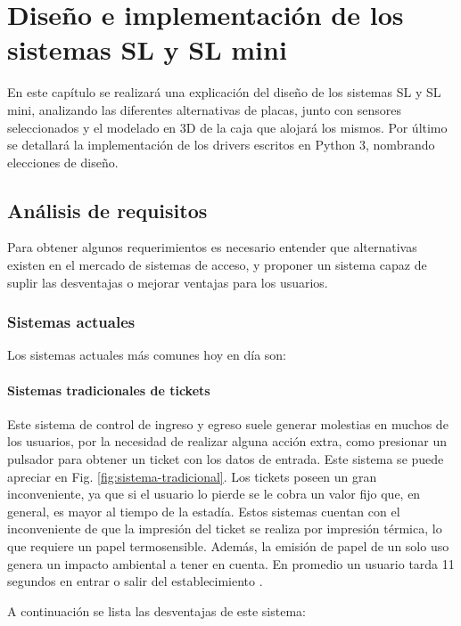\chapter{Diseño e implementación de los sistemas SL y SL mini}

En este capítulo se realizará una explicación del diseño de los sistemas SL y SL mini, analizando las diferentes alternativas de placas, junto con sensores seleccionados y el modelado en 3D de la caja que alojará los mismos. Por último se detallará la implementación de los drivers escritos en Python 3, nombrando elecciones de diseño.

\section{Análisis de requisitos}

Para obtener algunos requerimientos es necesario entender que alternativas existen en el mercado de sistemas de acceso, y proponer un sistema capaz de suplir las desventajas o mejorar ventajas para los usuarios.

\subsection{Sistemas actuales}

Los sistemas actuales más comunes hoy en día son:

\subsubsection*{Sistemas tradicionales de tickets}

Este sistema de control de ingreso y egreso suele generar molestias en muchos de los usuarios, por la necesidad de realizar alguna acción extra, como presionar un pulsador para obtener un ticket con los datos de entrada. Este sistema se puede apreciar en Fig. \ref{fig:sistema-tradicional}.
Los tickets poseen un gran inconveniente, ya que si el usuario lo pierde se le cobra un valor fijo que, en general, es mayor al tiempo de la estadía.
Estos sistemas cuentan con el inconveniente de que la impresión del ticket se realiza por impresión térmica, lo que requiere un papel termosensible.
Además, la emisión de papel de un solo uso genera un impacto ambiental a tener en cuenta.
En promedio un usuario tarda 11 segundos en entrar o salir del establecimiento \cite{casadomo_sistema_2015}.

A continuación se lista las desventajas de este sistema:

